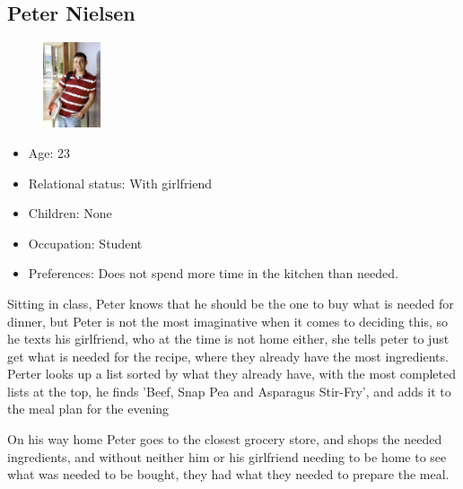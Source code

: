 \subsection{Peter Nielsen}	\label{PersonaPeterNielsen}
\begin{figure}[H]
	\includegraphics[width=0.15\textwidth]{Grafik/FoodPlanner/PersonaPeterNielsen}
\end{figure}
\begin{itemize}
	\item Age: 23
	\item Relational status: With girlfriend
	\item Children: None
	\item Occupation: Student
	\item Preferences: Does not spend more time in the kitchen than needed.
\end{itemize}
Sitting in class, Peter knows that he should be the one to buy what is needed for dinner, but Peter is not the most imaginative when it comes to deciding this, so he texts his girlfriend, who at the time is not home either, she tells peter to just get what is needed for the recipe, where they already have the most ingredients. Perter looks up a list sorted by what they already have, with the most completed lists at the top, he finds 'Beef, Snap Pea and Asparagus Stir-Fry', and adds it to the meal plan for the evening

On his way home Peter goes to the closest grocery store, and shops the needed ingredients, and without neither him or his girlfriend needing to be home to see what was needed to be bought, they had what they needed to prepare the meal.

